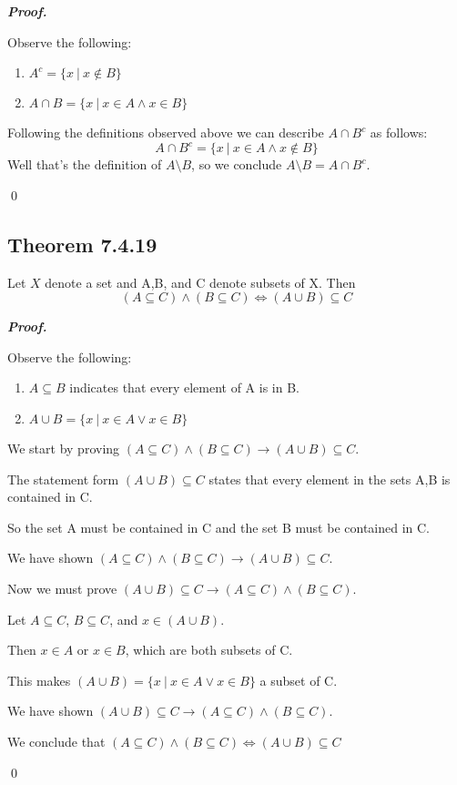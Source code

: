 \documentclass{article}
\begin{document}
\textbf{\textit{Proof.}}

Observe the following:
\begin{enumerate}
	\item $A^c = \{x\ |\ x \not\in B \}$
	\item $A \cap B = \{x\ |\ x \in A \land x \in B \}$
\end{enumerate}

Following the definitions observed above we can describe $A \cap B^c$ as follows:
\begin{equation}
	A \cap B^c = \{x\ |\ x \in A \land x \not\in B \}
\end{equation}
Well that's the definition of $A \setminus B$, so we conclude $A \setminus B = A \cap B^c$.

\qed



\pagebreak
\subsection{Theorem 7.4.19}
Let $X$ denote a set and A,B, and C denote subsets of X. Then
\begin{equation}
	(A \subseteq C) \land (B \subseteq C) \iff (A \cup B) \subseteq C
\end{equation}

\textbf{\textit{Proof.}}

Observe the following:
\begin{enumerate}
	\item $A \subseteq B$ indicates that every element of A is in B.
	\item $A \cup B = \{x\ |\ x \in A \lor x \in B \}$
\end{enumerate}

We start by proving $(A \subseteq C) \land (B \subseteq C) \rightarrow (A \cup B) \subseteq C$.

The statement form $(A \cup B) \subseteq C$ states that every element in the sets A,B is contained in C.

So the set A must be contained in C and the set B must be contained in C.

We have shown $(A \subseteq C) \land (B \subseteq C) \rightarrow (A \cup B) \subseteq C$.

Now we must prove $(A \cup B) \subseteq C \rightarrow (A \subseteq C) \land (B \subseteq C)$.

Let $A \subseteq C$, $B \subseteq C$, and $x \in (A \cup B)$. 

Then $x \in A$ or $x \in B$, which are both subsets of C.

This makes $(A \cup B)=\{x\ |\ x \in A \lor x \in B \}$ a subset of C.

We have shown $(A \cup B) \subseteq C \rightarrow (A \subseteq C) \land (B \subseteq C)$.

We conclude that $(A \subseteq C) \land (B \subseteq C) \iff (A \cup B) \subseteq C$



\qed
\end{document}

